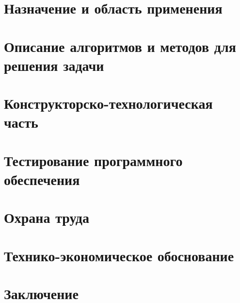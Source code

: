




\newpage
{}
\renewcommand\contentsname{\hfill Содержание \hfill}
\tableofcontents

\setcounter{figure}{0}
\section{Назначение и область применения}

\setcounter{figure}{0}
\section{Описание алгоритмов и методов для решения задачи}

\setcounter{figure}{0}
\section{Конструкторско-технологическая часть}

\setcounter{figure}{0}
\section{Тестирование программного обеспечения}

\setcounter{figure}{0}
\section{Охрана труда}

\setcounter{figure}{0}
\section{Технико-экономическое обоснование}

\setcounter{figure}{0}
\section{Заключение}

\newpage
\renewcommand{\refname}{Список использованных источников}


